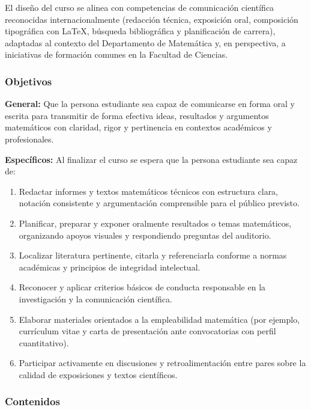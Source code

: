 \begin{refsection}
El diseño del curso se alinea con competencias de comunicación científica reconocidas internacionalmente (redacción técnica, exposición oral, composición tipográfica con \LaTeX{}, búsqueda bibliográfica y planificación de carrera), adaptadas al contexto del Departamento de Matemática y, en perspectiva, a iniciativas de formación comunes en la Facultad de Ciencias.

\subsubsection*{Objetivos}

\textbf{General:} Que la persona estudiante sea capaz de comunicarse en forma oral y escrita para transmitir de forma efectiva ideas, resultados y argumentos matemáticos con claridad, rigor y pertinencia en contextos académicos y profesionales.

\textbf{Específicos:} Al finalizar el curso se espera que la persona estudiante sea capaz de:

\begin{enumerate}
\item Redactar informes y textos matemáticos técnicos con estructura clara, notación consistente y argumentación comprensible para el público previsto.
\item Planificar, preparar y exponer oralmente resultados o temas matemáticos, organizando apoyos visuales y respondiendo preguntas del auditorio.
\item Localizar literatura pertinente, citarla y referenciarla conforme a normas académicas y principios de integridad intelectual.
\item Reconocer y aplicar criterios básicos de conducta responsable en la investigación y la comunicación científica.
\item Elaborar materiales orientados a la empleabilidad matemática (por ejemplo, currículum vitae y carta de presentación ante convocatorias con perfil cuantitativo).
\item Participar activamente en discusiones y retroalimentación entre pares sobre la calidad de exposiciones y textos científicos.
\end{enumerate}

\subsubsection*{Contenidos}


\end{refsection}

